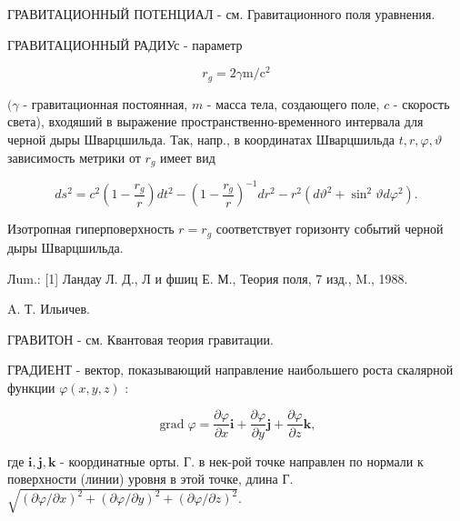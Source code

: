 \documentclass[10pt]{article}
\begin{document}
ГРАВИТАЦИОННЫЙ ПОТЕНЦИАЛ - см. Гравитационного поля уравнения.



ГРАВИТАЦИОННЫЙ РАДИУс - параметр



\[

r_{g}=2 \gamma \mathrm{m} / \mathrm{c}^{2}

\]



$(\gamma$ - гравитационная постоянная, $m$ - масса тела, создающего поле, $c$ - скорость света), входяший в выражение пространственно-временного интервала для черной дыры Шварцшильда. Так, напр., в координатах Шварцшильда $t, r, \varphi, \vartheta$ зависимость метрики от $r_{g}$ имеет вид



\[

d s^{2}=c^{2}\left(1-\frac{r_{g}}{r}\right) d t^{2}-\left(1-\frac{r_{g}}{r}\right)^{-1} d r^{2}-r^{2}\left(d \vartheta^{2}+\sin ^{2} \vartheta d \varphi^{2}\right) .

\]



Изотропная гиперповерхность $r=r_{g}$ соответствует горизонту событий черной дыры Шварцшильда.



Лum.: [1] Ландау Л. Д., Л и фшиц Е. М., Теория поля, 7 изд., M., 1988.



A. Т. Ильичев.



ГРАВИТОН - см. Квантовая теория гравитации.



ГРАДИЕНТ - вектор, показывающий направление наибольшего роста скалярной функции $\varphi(x, y, z)$ :



\[

\operatorname{grad} \varphi=\frac{\partial \varphi}{\partial x} \boldsymbol{i}+\frac{\partial \varphi}{\partial y} \boldsymbol{j}+\frac{\partial \varphi}{\partial z} \boldsymbol{k},

\]



где $\boldsymbol{i}, \boldsymbol{j}, \boldsymbol{k}$ - координатные орты. Г. в нек-рой точке направлен по нормали к поверхности (линии) уровня в этой точке, длина Г. $\sqrt{(\partial \varphi / \partial x)^{2}+(\partial \varphi / \partial y)^{2}+(\partial \varphi / \partial z)^{2}}$.
\end{document}
